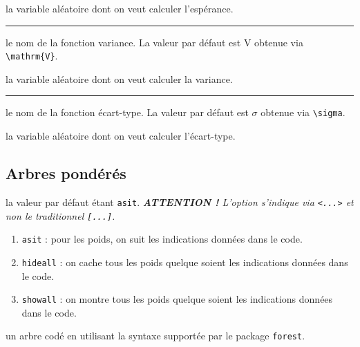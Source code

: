 \documentclass[12pt,a4paper]{article}
\theoremstyle{definition}
\newcommand\separation{
    \medskip
    \hfill\rule{0.5\textwidth}{0.75pt}\hfill
    \medskip
}
\begin{document}
\IDarg{} la variable aléatoire dont on veut calculer l'espérance.


\separation



\IDoption{} le nom de la fonction variance. La valeur par défaut est $\mathrm{V}$ obtenue via \verb#\mathrm{V}#.

\IDarg{} la variable aléatoire dont on veut calculer la variance.


\separation



\IDoption{} le nom de la fonction écart-type. La valeur par défaut est $\sigma$ obtenue via \verb#\sigma#.

\IDarg{} la variable aléatoire dont on veut calculer l'écart-type.


























\subsection{Arbres pondérés}




\IDoption{} la valeur par défaut étant \verb#asit#.
            \emph{\textbf{ATTENTION !} L'option s'indique via \texttt{<...>} et non le traditionnel \texttt{[...]}.}

\begin{enumerate}
    \item \verb#asit# : pour les poids, on suit les indications données dans le code.

    \item \verb#hideall# : on cache tous les poids quelque soient les indications données dans le code.

    \item \verb#showall# : on montre tous les poids quelque soient les indications données dans le code.
\end{enumerate}

\Content{} un arbre codé en utilisant la syntaxe supportée par le package \verb#forest#.
\end{document}
